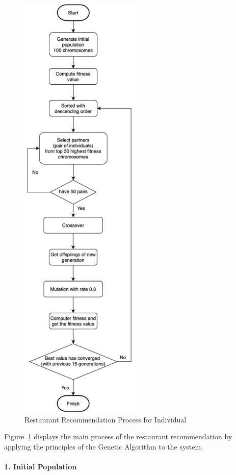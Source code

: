 \documentclass[12pt,oneside,openright,a4paper]{cpe-english-project}
\begin{document}
\begin{figure}[H]\centering
\includegraphics[height=600pt]{./images/3GeneticAlgorithmFlowchart.png}
\caption{Restaurant Recommendation Process for Individual}\label{fig:3GeneticAlgorithmFlowchart}
\end{figure}

Figure~\ref{fig:3GeneticAlgorithmFlowchart} displays the main process of the restaurant recommendation by applying the principles of the Genetic Algorithm to the system.

\paragraph*{1. Initial Population}\
\end{document}
